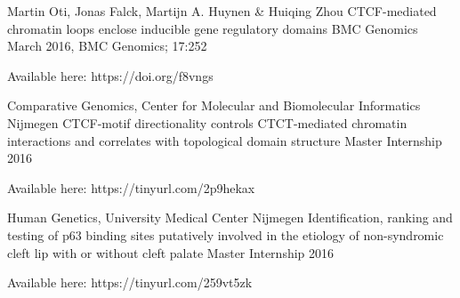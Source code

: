 

\begin{cventries}

\cventry
  {Martin Oti, Jonas Falck, Martijn A. Huynen \& Huiqing Zhou}
  {CTCF-mediated chromatin loops enclose inducible gene regulatory domains} %
  {BMC Genomics}
  {March 2016, BMC Genomics; 17:252} %
  {    
  \begin{cvitems} %
    \item {Available here: https://doi.org/f8vngs}
  \end{cvitems}
  }

\cventry
  {Comparative Genomics,  Center for Molecular and Biomolecular Informatics Nijmegen} %
  {CTCF-motif directionality controls CTCT-mediated chromatin interactions and correlates with topological domain structure} %
  {Master Internship} %
  {2016} %
  {
    \begin{cvitems} %
      \item {Available here: https://tinyurl.com/2p9hekax}
    \end{cvitems}
  }

\cventry
  {Human Genetics, University Medical Center Nijmegen} %
  {Identification, ranking and testing of p63 binding sites putatively involved in the etiology of non-syndromic cleft lip with or without cleft palate} %
  {Master Internship} %
  {2016} %
  {
    \begin{cvitems} %
      \item {Available here: https://tinyurl.com/259vt5zk}
    \end{cvitems}
  }

\end{cventries}
